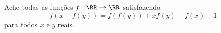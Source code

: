 Ache todas as funções $f: \RR \to \RR$ satisfazendo
$$ f(x - f(y)) = f(f(y)) + xf(y) + f(x) - 1$$
para todos $x$ e $y$ reais.
